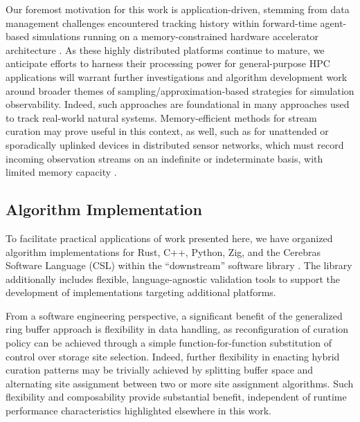 Our foremost motivation for this work is application-driven, stemming from data management challenges encountered tracking history within forward-time agent-based simulations running on a memory-constrained hardware accelerator architecture \citep{moreno2024trackable}.
As these highly distributed platforms continue to mature, we anticipate efforts to harness their processing power for general-purpose HPC applications will warrant further investigations and algorithm development work around broader themes of sampling/approximation-based strategies for simulation observability.
Indeed, such approaches are foundational in many approaches used to track real-world natural systems.
Memory-efficient methods for stream curation may prove useful in this context, as well, such as for unattended or sporadically uplinked devices in distributed sensor networks, which must record incoming observation streams on an indefinite or indeterminate basis, with limited memory capacity \citep{elnahrawy2003research,jain2022survey,hadiatna2016design}.

\subsection{Algorithm Implementation}

To facilitate practical applications of work presented here, we have organized algorithm implementations for Rust, C++, Python, Zig, and the Cerebras Software Language (CSL) within the ``downstream'' software library \citep{moreno2024downstream}.
The library additionally includes flexible, language-agnostic validation tools to support the development of implementations targeting additional platforms.

From a software engineering perspective, a significant benefit of the generalized ring buffer approach is flexibility in data handling, as reconfiguration of curation policy can be achieved through a simple function-for-function substitution of control over storage site selection.
Indeed, further flexibility in enacting hybrid curation patterns may be trivially achieved by splitting buffer space and alternating site assignment between two or more site assignment algorithms.
Such flexibility and composability provide substantial benefit, independent of runtime performance characteristics highlighted elsewhere in this work.
